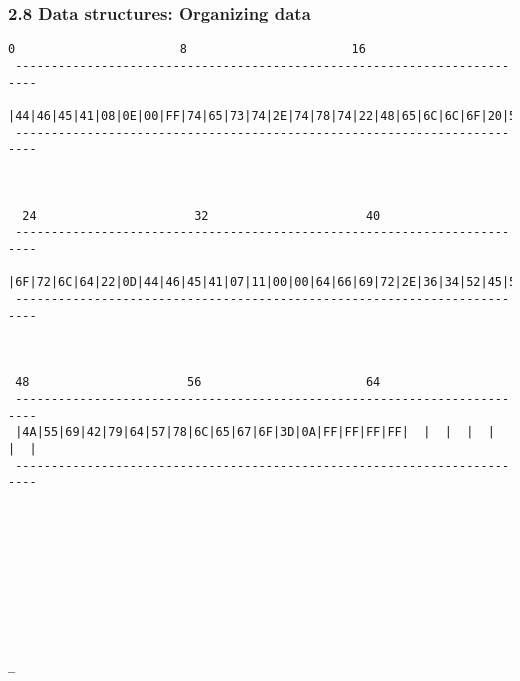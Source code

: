 \begin{frame}[fragile]
  \frametitle{2.8 Data structures: Organizing data}
\begin{lstlisting}[basicstyle=\tiny]
  0                       8                       16                      
 ------------------------------------------------------------------------- 
 |44|46|45|41|08|0E|00|FF|74|65|73|74|2E|74|78|74|22|48|65|6C|6C|6F|20|57|
 -------------------------------------------------------------------------
                                                        


  24                      32                      40
 -------------------------------------------------------------------------
 |6F|72|6C|64|22|0D|44|46|45|41|07|11|00|00|64|66|69|72|2E|36|34|52|45|5A|
 -------------------------------------------------------------------------
                   


 48                      56                       64
 -------------------------------------------------------------------------
 |4A|55|69|42|79|64|57|78|6C|65|67|6F|3D|0A|FF|FF|FF|FF|  |  |  |  |  |  |
 -------------------------------------------------------------------------










_  
\end{lstlisting}
\end{frame}


